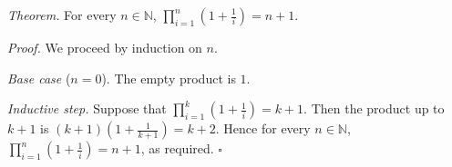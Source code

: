 \textit{Theorem.} For every $n \in \mathbb{N}$, $\prod_{i=1}^{n} (1 + \frac{1}{i}) = n + 1$.

\textit{Proof.} We proceed by induction on $n$.

\textit{Base case} ($n = 0$). The empty product is $1$.

\textit{Inductive step.} Suppose that $\prod_{i=1}^{k} (1 + \frac{1}{i}) = k + 1$.
Then the product up to $k + 1$ is $(k + 1)(1 + \frac{1}{k + 1}) = k + 2$.
Hence for every $n \in \mathbb{N}$, $\prod_{i=1}^{n} (1 + \frac{1}{i}) = n + 1$, as required. \hfill$\square$